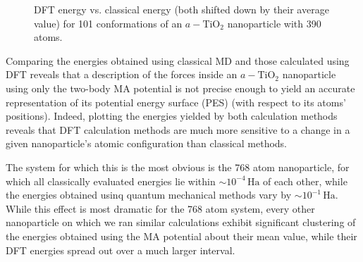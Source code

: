 \documentclass[aps,prb,twocolumn,amsmath,amssymb,superscriptaddress,longbibliography]{revtex4-1}
\newcommand\tab[1][1cm]{\hspace*{#1}} %
\begin{document}
\begin{figure}[htb]
\caption{DFT energy vs. classical energy (both shifted down by their average value) for 101 conformations of an $a-\text{TiO}_2$ nanoparticle with 390 atoms.}
\label{nnp_390}
\end{figure}

\tab Comparing the energies obtained using classical MD and those calculated using DFT reveals that a description of the forces inside an $a-\text{TiO}_2$ nanoparticle using only the two-body MA potential is not precise enough to yield an accurate representation of its potential energy surface (PES) (with respect to its atoms' positions).
Indeed, plotting the energies yielded by both calculation methods reveals that DFT calculation methods are much more sensitive to a change in a given nanoparticle's atomic configuration than classical methods.

\tab The system for which this is the most obvious is the 768 atom nanoparticle, for which all classically evaluated energies lie within $\sim 10^{-4}\,\text{Ha}$ of each other, while the energies obtained usinq quantum mechanical methods vary by $\sim 10^{-1}\,\text{Ha}$.
While this effect is most dramatic for the 768 atom system, every other nanoparticle on which we ran similar calculations exhibit significant clustering of the energies obtained using the MA potential about their mean value, while their DFT energies spread out over a much larger interval.
    
\end{document}
